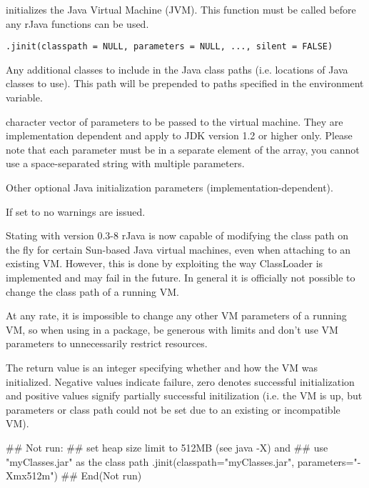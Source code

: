 \begin{Description}\relax
{} initializes the Java Virtual Machine (JVM). This
function must be called before any rJava functions can be used.
\end{Description}
\begin{Usage}
\begin{verbatim}
.jinit(classpath = NULL, parameters = NULL, ..., silent = FALSE)
\end{verbatim}
\end{Usage}
\begin{Arguments}
\begin{ldescription}
\item[\code{classpath}] Any additional classes to include in the Java class
paths (i.e. locations of Java classes to use). This path will be
prepended to paths specified in the  environment
variable.
\item[\code{parameters}] character vector of parameters to be passed to
the virtual machine. They are implementation dependent and apply
to JDK version 1.2 or higher only. Please note that each parameter
must be in a separate element of the array, you cannot use a
space-separated string with multiple parameters.
\item[\code{...}] Other optional Java initialization parameters (implementation-dependent).
\item[\code{silent}] If set to  no warnings are issued.
\end{ldescription}
\end{Arguments}
\begin{Details}\relax
Stating with version 0.3-8 rJava is now capable of modifying the class
path on the fly for certain Sun-based Java virtual machines, even when
attaching to an existing VM. However, this is done by exploiting the
way ClassLoader is implemented and may fail in the future. In general
it is officially not possible to change the class path of a running
VM.

At any rate, it is impossible to change any other VM parameters of a
running VM, so when using  in a package, be generous with
limits and don't use VM parameters to unnecessarily restrict
resources.
\end{Details}
\begin{Value}
The return value is an integer specifying whether and how the VM was
initialized. Negative values indicate failure, zero denotes successful
initialization and positive values signify partially successful
initilization (i.e. the VM is up, but parameters or class path could
not be set due to an existing or incompatible VM).
\end{Value}
\begin{SeeAlso}\relax
\end{SeeAlso}
\begin{Examples}
\begin{ExampleCode}
## Not run: 
## set heap size limit to 512MB (see java -X) and
## use "myClasses.jar" as the class path
.jinit(classpath="myClasses.jar", parameters="-Xmx512m")
## End(Not run)
\end{ExampleCode}
\end{Examples}

